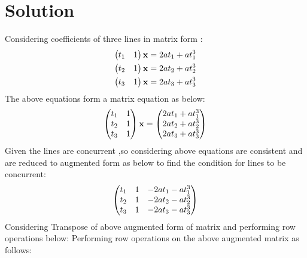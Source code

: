 \documentclass[journal,12pt,twocolumn]{IEEEtran}
\begin{document}
\section*{\textbf{Solution}}
\noindent
Considering coefficients of three lines in matrix form :
\begin{align}
\begin{pmatrix}t_1&1\end{pmatrix}\mathbf{x}=2at_1+at_1^3\\
\begin{pmatrix}t_2&1\end{pmatrix}\mathbf{x}=2at_2+at_2^3\\
\begin{pmatrix}t_3&1\end{pmatrix}\mathbf{x}=2at_3+at_3^3
\end{align}
The above equations form a matrix equation as below:
\begin{align}
\begin{pmatrix}t_1&1\\t_2&1\\t_3&1\end{pmatrix}\mathbf{x}=\begin{pmatrix}2at_1+at_1^3\\2at_2+at_2^3\\2at_3+at_3^3\end{pmatrix}
\end{align}
Given the lines are concurrent ,so considering above equations are consistent and are reduced to augmented form as below to find the condition for lines to be concurrent:
\begin{align}
\begin{pmatrix}
t_1&1&-2at_1-at_1^3\\
t_2&1&-2at_2-at_2^3\\
t_3&1&-2at_3-at_3^3
\end{pmatrix}
\end{align}
Considering Transpose of above augmented form of matrix and performing row operations below:
Performing row operations on the above augmented matrix as follows:
\end{document}
